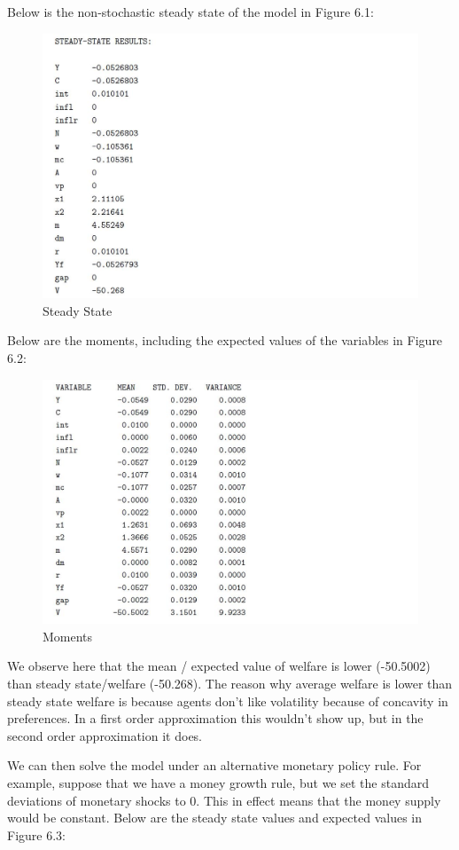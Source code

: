 \documentclass[10pt,math=newtx,citestyle=gb7714-2015,bibstyle=gb7714-2015]{elegantbook}
\begin{document}
{	Below is the non-stochastic steady state of the model in Figure 6.1:
	
	\begin{figure}[htbp!]
		\centering
		\includegraphics[width=0.8\linewidth]{FIG/SS}
		\caption{Steady State}\label{6.1}
		\centering
	\end{figure}
	
	Below are the moments, including the expected values of the variables in Figure 6.2:
	\begin{figure}[htbp!]
		\centering
		\includegraphics[width=0.8\linewidth]{FIG/moment}
		\caption{Moments}\label{6.2}
		\centering
	\end{figure}
	
	We observe here that the mean / expected value of welfare is lower (-50.5002) than steady state/welfare (-50.268). The reason why average welfare is lower than steady state welfare is because agents don't like volatility because of concavity in preferences. In a first order approximation this wouldn't show up, but in the second order approximation it does.
	
	We can then solve the model under an alternative monetary policy rule. For example, suppose that we have a money growth rule, but we set the standard deviations of monetary shocks to 0. This in effect means that the money supply would be constant. Below are the steady state values and expected values in Figure 6.3:
	
}
\end{document}
